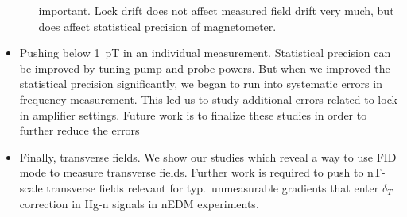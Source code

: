 \begin{itemize}
\begin{itemize}
      important.  Lock drift does not affect measured field drift very
      much, but does affect statistical precision of magnetometer.
  \end{itemize}
\item Pushing below 1~pT in an individual measurement.  Statistical
  precision can be improved by tuning pump and probe powers.  But when
  we improved the statistical precision significantly, we began to run
  into systematic errors in frequency measurement.  This led us to
  study additional errors related to lock-in amplifier settings.
  Future work is to finalize these studies in order to further reduce
  the errors
\item Finally, transverse fields.  We show our studies which reveal a
  way to use FID mode to measure transverse fields.  Further work is
  required to push to nT-scale transverse fields relevant for
  typ.~unmeasurable gradients that enter $\delta_T$ correction in Hg-n
  signals in nEDM experiments.
\end{itemize}







